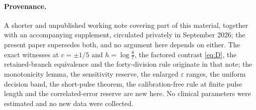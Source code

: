 \documentclass[11pt]{article}
\theoremstyle{plain}
\theoremstyle{definition}
\theoremstyle{remark}
\newcommand{\eps}{\varepsilon}
\begin{document}
\paragraph{Provenance.} A shorter and unpublished working note covering part of
this material, together with an accompanying supplement, circulated privately in
September 2026; the present paper supersedes both, and no argument here depends
on either. The exact witnesses at $c=\pm1/5$ and $h=\log\frac87$, the factored
contrast \eqref{eq:D}, the retained-branch equivalence and the forty-division
rule originate in that note; the monotonicity lemma, the sensitivity reserve,
the enlarged $\eps$ ranges, the uniform decision band, the short-pulse theorem,
the calibration-free rule at finite pulse length and the correlated-error
reserve are new here. No clinical parameters were estimated and no new data were
collected.



\end{document}
